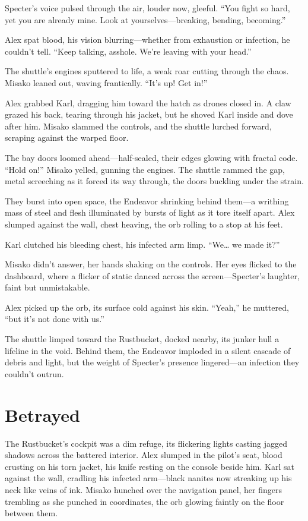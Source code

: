 \documentclass[12pt]{book}
\begin{document}
Specter’s voice pulsed through the air, louder now, gleeful. “You fight so hard, yet you are already mine. Look at yourselves—breaking, bending, becoming.”

Alex spat blood, his vision blurring—whether from exhaustion or infection, he couldn’t tell. “Keep talking, asshole. We’re leaving with your head.”

The shuttle’s engines sputtered to life, a weak roar cutting through the chaos. Misako leaned out, waving frantically. “It’s up! Get in!”

Alex grabbed Karl, dragging him toward the hatch as drones closed in. A claw grazed his back, tearing through his jacket, but he shoved Karl inside and dove after him. Misako slammed the controls, and the shuttle lurched forward, scraping against the warped floor.

The bay doors loomed ahead—half-sealed, their edges glowing with fractal code. “Hold on!” Misako yelled, gunning the engines. The shuttle rammed the gap, metal screeching as it forced its way through, the doors buckling under the strain.

They burst into open space, the Endeavor shrinking behind them—a writhing mass of steel and flesh illuminated by bursts of light as it tore itself apart. Alex slumped against the wall, chest heaving, the orb rolling to a stop at his feet.

Karl clutched his bleeding chest, his infected arm limp. “We… we made it?”

Misako didn’t answer, her hands shaking on the controls. Her eyes flicked to the dashboard, where a flicker of static danced across the screen—Specter’s laughter, faint but unmistakable.

Alex picked up the orb, its surface cold against his skin. “Yeah,” he muttered, “but it’s not done with us.”

The shuttle limped toward the Rustbucket, docked nearby, its junker hull a lifeline in the void. Behind them, the Endeavor imploded in a silent cascade of debris and light, but the weight of Specter’s presence lingered—an infection they couldn’t outrun.


\chapter{Betrayed}
The Rustbucket’s cockpit was a dim refuge, its flickering lights casting jagged shadows across the battered interior. Alex slumped in the pilot’s seat, blood crusting on his torn jacket, his knife resting on the console beside him. Karl sat against the wall, cradling his infected arm—black nanites now streaking up his neck like veins of ink. Misako hunched over the navigation panel, her fingers trembling as she punched in coordinates, the orb glowing faintly on the floor between them.
\end{document}
